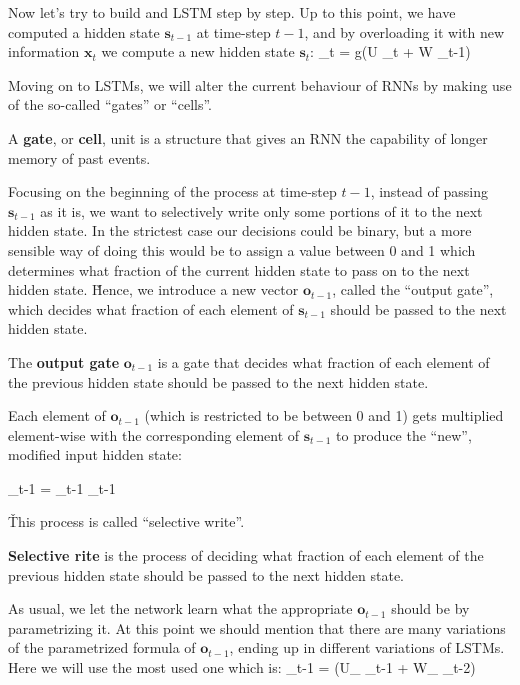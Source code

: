 Now let's try to build and LSTM step by step. Up to this point, we have computed a hidden state $\boldsymbol{s}_{t-1}$
at time-step $t - 1$, and by overloading it with new information $\boldsymbol{x}_{t}$ we compute a new hidden state
$\boldsymbol{s}_{t}$:
\bse
{}_{t} = g(U _{t} + W _{t-1})
\ese


Moving on to LSTMs, we will alter the current behaviour of RNNs by making use of the so-called ``gates'' or ``cells''.

A \textbf{gate}, or \textbf{cell}, unit is a structure that gives an RNN the capability of longer memory of past events.
\ed

Focusing on the beginning of the process at time-step $t-1$, instead of passing $\boldsymbol{s}_{t-1}$ as it is, we
want to selectively write only some portions of it to the next hidden state. In the strictest case our decisions could
be binary, but a more sensible way of doing this would be to assign a value between 0 and 1 which determines what
fraction of the current hidden state to pass on to the next hidden state. \v

Hence, we introduce a new vector $\boldsymbol{o}_{t-1}$, called the ``output gate'', which decides what fraction of each
element of $\boldsymbol{s}_{t-1}$ should be passed to the next hidden state.

The \textbf{output gate} $\boldsymbol{o}_{t-1}$ is a gate that decides what fraction of each element of the previous
hidden state should be passed to the next hidden state.
\ed

Each element of $\boldsymbol{o}_{t-1}$ (which is restricted to be between 0 and 1) gets multiplied element-wise with
the corresponding element of $\boldsymbol{s}_{t-1}$ to produce the ``new'', modified input hidden state:

\bse
{}_{t-1} = _{t-1} \odot {}_{t-1}
\ese

\v

This process is called ``selective write''.

\textbf{Selective rite} is the process of deciding what fraction of each element of the previous hidden state should be
passed to the next hidden state.
\ed


As usual, we let the network learn what the appropriate $\boldsymbol{o}_{t-1}$ should be by parametrizing it. At this
point we should mention that there are many variations of the parametrized formula of $\boldsymbol{o}_{t-1}$, ending up
in different variations of LSTMs. Here we will use the most used one which is:
\bse
{}_{t-1} = \sigma(U_{} _{t-1} + W_{} _{t-2})
\ese

